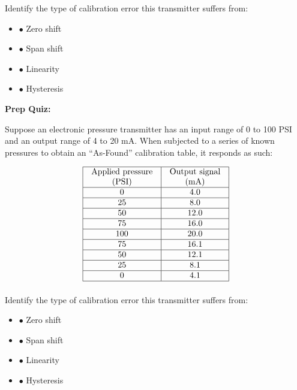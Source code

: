 \vskip 10pt

Identify the type of calibration error this transmitter suffers from:

\begin{itemize}
\item{$\bullet$} Zero shift
\vskip 5pt 
\item{$\bullet$} Span shift
\vskip 5pt 
\item{$\bullet$} Linearity
\vskip 5pt 
\item{$\bullet$} Hysteresis
\medskip
\end{itemize}




\vfil \eject

\noindent
{\bf Prep Quiz:}

Suppose an electronic pressure transmitter has an input range of 0 to 100 PSI and an output range of 4 to 20 mA.  When subjected to a series of known pressures to obtain an ``As-Found'' calibration table, it responds as such:


$$\vbox{\offinterlineskip
\halign{\strut
\vrule \quad\hfil # \ \hfil & 
\vrule \quad\hfil # \ \hfil \vrule \cr
\noalign{\hrule}
%
Applied pressure & Output signal \cr
%
(PSI) & (mA) \cr
%
\noalign{\hrule}
%
0 & 4.0 \cr
%
\noalign{\hrule}
%
25 & 8.0 \cr
%
\noalign{\hrule}
%
50 & 12.0 \cr
%
\noalign{\hrule}
%
75 & 16.0 \cr
%
\noalign{\hrule}
%
100 & 20.0 \cr
%
\noalign{\hrule}
%
75 & 16.1 \cr
%
\noalign{\hrule}
%
50 & 12.1 \cr
%
\noalign{\hrule}
%
25 & 8.1 \cr
%
\noalign{\hrule}
%
0 & 4.1 \cr
%
\noalign{\hrule}
} %
}$$ %

\vskip 10pt

Identify the type of calibration error this transmitter suffers from:

\begin{itemize}
\item{$\bullet$} Zero shift
\vskip 5pt 
\item{$\bullet$} Span shift
\vskip 5pt 
\item{$\bullet$} Linearity
\vskip 5pt 
\item{$\bullet$} Hysteresis
\medskip
\end{itemize}




